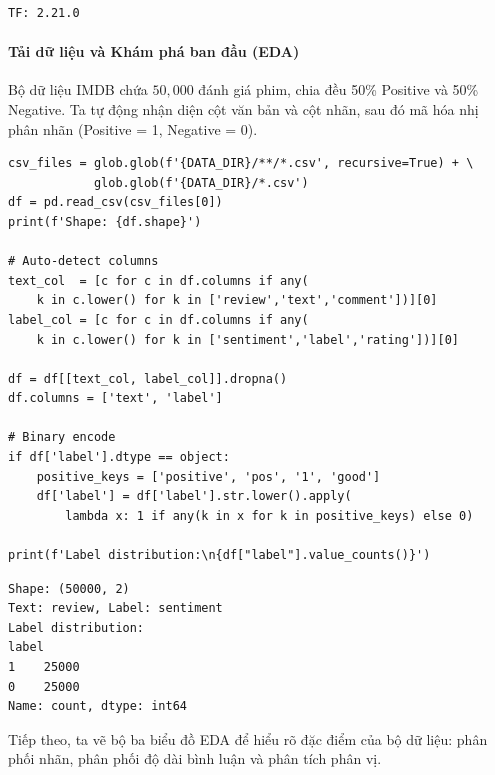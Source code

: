 \begin{lstlisting}[style=consoleoutput, caption={Output: Phiên bản TensorFlow}]
TF: 2.21.0
\end{lstlisting}

\paragraph{Tải dữ liệu và Khám phá ban đầu (EDA)} \hfill\mbox{}

Bộ dữ liệu IMDB chứa $50{,}000$ đánh giá phim, chia đều 50\% Positive và 50\% Negative. Ta tự động nhận diện cột văn bản và cột nhãn, sau đó mã hóa nhị phân nhãn (Positive = 1, Negative = 0).

\begin{lstlisting}[style=pythoncode, caption={Đọc dữ liệu IMDB và phân phối nhãn}]
csv_files = glob.glob(f'{DATA_DIR}/**/*.csv', recursive=True) + \
            glob.glob(f'{DATA_DIR}/*.csv')
df = pd.read_csv(csv_files[0])
print(f'Shape: {df.shape}')

# Auto-detect columns
text_col  = [c for c in df.columns if any(
    k in c.lower() for k in ['review','text','comment'])][0]
label_col = [c for c in df.columns if any(
    k in c.lower() for k in ['sentiment','label','rating'])][0]

df = df[[text_col, label_col]].dropna()
df.columns = ['text', 'label']

# Binary encode
if df['label'].dtype == object:
    positive_keys = ['positive', 'pos', '1', 'good']
    df['label'] = df['label'].str.lower().apply(
        lambda x: 1 if any(k in x for k in positive_keys) else 0)

print(f'Label distribution:\n{df["label"].value_counts()}')
\end{lstlisting}

\begin{lstlisting}[style=consoleoutput, caption={Output: Thông tin tập dữ liệu IMDB}]
Shape: (50000, 2)
Text: review, Label: sentiment
Label distribution:
label
1    25000
0    25000
Name: count, dtype: int64
\end{lstlisting}

Tiếp theo, ta vẽ bộ ba biểu đồ EDA để hiểu rõ đặc điểm của bộ dữ liệu: phân phối nhãn, phân phối độ dài bình luận và phân tích phân vị.

